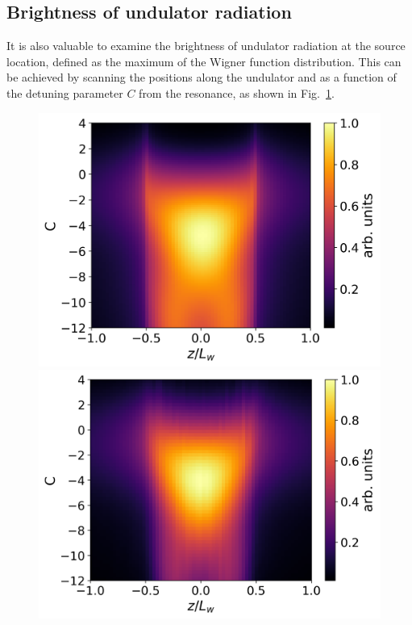 \subsection{Brightness of undulator radiation}
    It is also valuable to examine the brightness of undulator radiation at the source location, defined as the maximum of the Wigner function distribution. This can be achieved by scanning the positions along the undulator and as a function of the detuning parameter $C$ from the resonance, as shown in Fig.~\ref{Fig:badman}.
    \begin{figure}[h!]
        \centering
        \begin{minipage}[b]{0.48\linewidth}
            \centering
            \includegraphics[width=\linewidth]{content/images/Synchrotron_Radiation/badman.png}
            \captionsetup{justification=centering}
            \caption{}
            \label{Fig:badman}
        \end{minipage}
        \hspace{0.02\linewidth}
        \begin{minipage}[b]{0.48\linewidth}
            \centering
            \includegraphics[width=\linewidth]{content/images/Synchrotron_Radiation/badman_Nw_10.png}

\end{minipage}
\end{figure}
